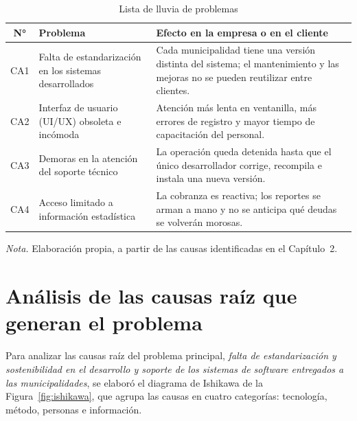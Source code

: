 \documentclass[12pt,a4paper]{report}
\begin{document}
\begin{table}[H]
\centering
\caption{Lista de lluvia de problemas}
\label{tab:lluvia}
\begin{tabular}{cp{5.2cm}p{7.2cm}}
\toprule
\textbf{N°} & \textbf{Problema} & \textbf{Efecto en la empresa o en el cliente} \\
\midrule
CA1 & Falta de estandarización en los sistemas desarrollados & Cada municipalidad tiene una versión distinta del sistema; el mantenimiento y las mejoras no se pueden reutilizar entre clientes. \\
CA2 & Interfaz de usuario (UI/UX) obsoleta e incómoda & Atención más lenta en ventanilla, más errores de registro y mayor tiempo de capacitación del personal. \\
CA3 & Demoras en la atención del soporte técnico & La operación queda detenida hasta que el único desarrollador corrige, recompila e instala una nueva versión. \\
CA4 & Acceso limitado a información estadística & La cobranza es reactiva; los reportes se arman a mano y no se anticipa qué deudas se volverán morosas. \\
\bottomrule
\end{tabular}

\vspace{0.3cm}
\footnotesize\textit{Nota.} Elaboración propia, a partir de las causas identificadas en el Capítulo~2.
\end{table}

\section{Análisis de las causas raíz que generan el problema}

Para analizar las causas raíz del problema principal, \textit{falta de estandarización y sostenibilidad en el desarrollo y soporte de los sistemas de software entregados a las municipalidades}, se elaboró el diagrama de Ishikawa de la Figura~\ref{fig:ishikawa}, que agrupa las causas en cuatro categorías: tecnología, método, personas e información.
\end{document}
